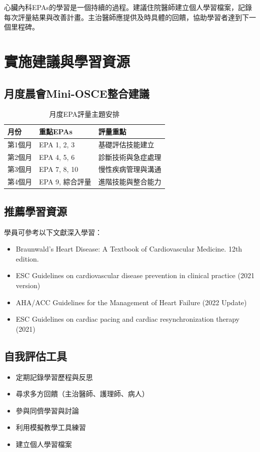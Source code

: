 \documentclass[12pt,a4paper]{article}
\newcommand{\note}[1]{
    \par
    \noindent
    \begin{tcolorbox}[
        colback=emergency_blue!5!white,
        colframe=emergency_blue,
        title=\textbf{重點提醒},
        fonttitle=\bfseries,
        boxrule=0.5pt,
        arc=3pt,
        left=6pt,
        right=6pt,
        top=6pt,
        bottom=6pt
    ]
    #1
    \end{tcolorbox}
}
\begin{document}
\vspace{0.5cm}
\note{
心臟內科EPAs的學習是一個持續的過程。建議住院醫師建立個人學習檔案，記錄每次評量結果與改善計畫。主治醫師應提供及時具體的回饋，協助學習者達到下一個里程碑。
}

\section{實施建議與學習資源}

\subsection{月度晨會Mini-OSCE整合建議}
\begin{table}[h]
    \centering
    \caption{月度EPA評量主題安排}
    \begin{tabular}{p{3cm} p{5cm} p{6cm}}
        \toprule
        \textbf{月份} & \textbf{重點EPAs} & \textbf{評量重點} \\
        \midrule
        第1個月 & EPA 1, 2, 3 & 基礎評估技能建立 \\
        第2個月 & EPA 4, 5, 6 & 診斷技術與急症處理 \\
        第3個月 & EPA 7, 8, 10 & 慢性疾病管理與溝通 \\
        第4個月 & EPA 9, 綜合評量 & 進階技能與整合能力 \\
        \bottomrule
    \end{tabular}
\end{table}

\subsection{推薦學習資源}
學員可參考以下文獻深入學習：
\begin{itemize}
    \item Braunwald's Heart Disease: A Textbook of Cardiovascular Medicine. 12th edition.
    \item ESC Guidelines on cardiovascular disease prevention in clinical practice (2021 version)
    \item AHA/ACC Guidelines for the Management of Heart Failure (2022 Update)
    \item ESC Guidelines on cardiac pacing and cardiac resynchronization therapy (2021)
\end{itemize}

\subsection{自我評估工具}
\begin{itemize}[nosep]
    \item 定期記錄學習歷程與反思
    \item 尋求多方回饋（主治醫師、護理師、病人）
    \item 參與同儕學習與討論
    \item 利用模擬教學工具練習
    \item 建立個人學習檔案
\end{itemize}
\end{document}
